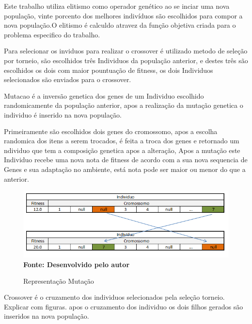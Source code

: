
Este trabalho utiliza elitismo como operador genético ao se inciar uma nova população, vinte porcento dos melhores indivíduos são escolhidos para compor a nova população.O elitismo é calculdo atravez da função objetiva criada para o problema especifico do trabalho.\par

Para selecionar os inviduos para realizar o crossover é utilizado metodo de seleção por torneio, são escolhidos três Individuos da população anterior, e destes três são escolhidos os dois com maior pountuação de fitness, os dois Individuos selecionados são enviados para o crossover.\par

Mutacao é a inversão genetica dos genes de um Individuo escolhido randomicamente da população anterior, apos a realização da mutação genetica o individuo é inserido na nova população.\par

Primeiramente são escolhidos dois genes do cromossomo, apos a escolha randomica dos itens a serem trocados, é feita a troca dos genes e retornado um ndividuo que tem a composição genetica apos a alteração, Apos a mutação este Individuo recebe uma nova nota de fitness de acordo com a sua nova sequencia de Genes e sua adaptação no ambiente, está nota pode ser maior ou menor do que a anterior.\par

\begin{figure}[!htb]
\caption[Representação Mutação]{Representação Mutação}
\label{fig:figura8}
\centering
\includegraphics[scale=0.7]{imagens/representacaoMutacao.png}
\\ \textbf{\footnotesize Fonte: Desenvolvido pelo autor}
\end{figure}

Crossover é o cruzamento dos individuos selecionados pela seleção torneio. Explicar com figuras. apos o cruzamento dos individuo os dois filhos gerados são inseridos na nova população.\par

